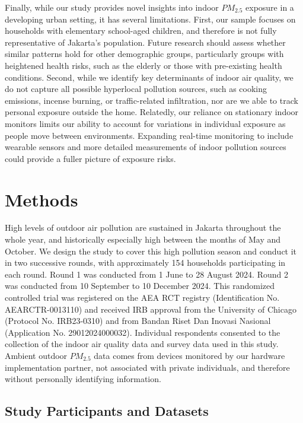 \documentclass[reqno,12pt,notitlepage]{article}
\begin{document}
Finally, while our study provides novel insights into indoor $PM_{2.5}$ exposure in a developing urban setting, it has several limitations. First, our sample focuses on  households with elementary school-aged children, and therefore is not fully representative of Jakarta’s population. Future research should assess whether similar patterns hold for other demographic groups, particularly groups with heightened health risks, such as the elderly or those with pre-existing health conditions. Second, while we identify key determinants of indoor air quality, we do not capture all possible hyperlocal pollution sources, such as cooking emissions, incense burning, or traffic-related infiltration, nor are we able to track personal exposure outside the home. Relatedly, our reliance on stationary indoor monitors limits our ability to account for variations in individual exposure as people move between environments. Expanding real-time monitoring to include wearable sensors and more detailed measurements of indoor pollution sources could provide a fuller picture of exposure risks.

\section{Methods}
High levels of outdoor air pollution are sustained in Jakarta throughout the whole year, and historically especially high between the months of May and October. We design the study to cover this high pollution season and conduct it in two successive rounds, with approximately 154 households participating in each round. Round 1 was conducted from 1 June to 28 August 2024. Round 2 was conducted from 10 September to 10 December 2024. This randomized controlled trial was registered on the AEA RCT registry (Identification No. AEARCTR-0013110) and received IRB approval from the University of Chicago (Protocol No. IRB23-0310) and from Bandan Riset Dan Inovasi Nasional (Application No. 29012024000032).
Individual respondents consented to the collection of the indoor air quality data and survey data used in this study. Ambient outdoor $PM_{2.5}$ data comes from devices monitored by our hardware implementation partner, not associated with private individuals, and therefore without personally identifying information.


\subsection{Study Participants and Datasets}
\label{ssec:mehtods_sampling}
\end{document}
